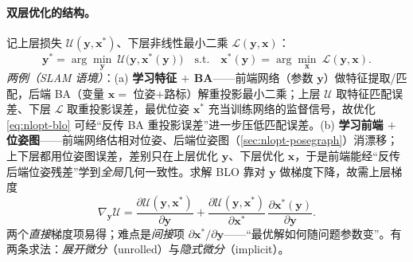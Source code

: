 \paragraph{双层优化的结构。}\cite{carlone2026handbook}
记上层损失 $\mathcal{U}(\mathbf{y},\mathbf{x}^*)$、下层非线性最小二乘 $\mathcal{L}(\mathbf{y},\mathbf{x})$：
\begin{equation}
  \mathbf{y}^*=\arg\min_{\mathbf{y}}\ \mathcal{U}\big(\mathbf{y},\mathbf{x}^*(\mathbf{y})\big)
  \quad\text{s.t.}\quad
  \mathbf{x}^*(\mathbf{y})=\arg\min_{\mathbf{x}}\ \mathcal{L}(\mathbf{y},\mathbf{x}).
  \label{eq:nlopt-blo}
\end{equation}
\emph{两例（SLAM 语境）}：(a) \textbf{学习特征 $+$ BA}——前端网络（参数 $\mathbf{y}$）做特征提取/匹配，后端 BA（变量 $\mathbf{x}=$ 位姿$+$路标）解重投影最小二乘；上层 $\mathcal{U}$ 取特征匹配误差、下层 $\mathcal{L}$ 取重投影误差，最优位姿 $\mathbf{x}^*$ 充当训练网络的监督信号，故优化 \cref{eq:nlopt-blo} 可经“反传 BA 重投影误差”进一步压低匹配误差。(b) \textbf{学习前端 $+$ 位姿图}——前端网络估相对位姿、后端位姿图（\cref{sec:nlopt-posegraph}）消漂移；上下层都用位姿图误差，差别只在上层优化 $\mathbf{y}$、下层优化 $\mathbf{x}$，于是前端能经“反传后端位姿残差”学到\emph{全局}几何一致性。求解 BLO 靠对 $\mathbf{y}$ 做梯度下降，故需上层梯度
\begin{equation}
  \nabla_{\mathbf{y}}\mathcal{U}
  =\frac{\partial\mathcal{U}(\mathbf{y},\mathbf{x}^*)}{\partial\mathbf{y}}
  +\frac{\partial\mathcal{U}(\mathbf{y},\mathbf{x}^*)}{\partial\mathbf{x}^*}\,
  \frac{\partial\mathbf{x}^*(\mathbf{y})}{\partial\mathbf{y}}.
  \label{eq:nlopt-blo-grad}
\end{equation}
两个\emph{直接}梯度项易得；难点是\emph{间接}项 $\partial\mathbf{x}^*/\partial\mathbf{y}$——“最优解如何随问题参数变”。有两条求法：\emph{展开微分}（unrolled）与\emph{隐式微分}（implicit）。

